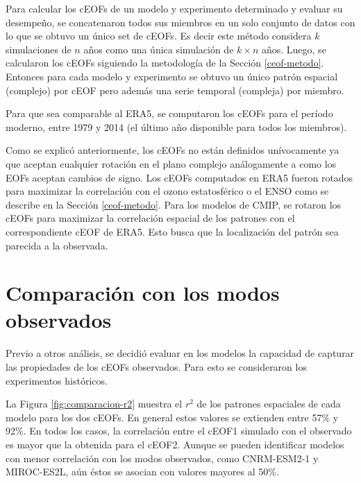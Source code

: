 \documentclass[12pt,oneside,a4paper]{reedthesis}
\begin{document}
Para calcular los cEOFs de un modelo y experimento determinado y evaluar su desempeño, se concatenaron todos sus miembros en un solo conjunto de datos con lo que se obtuvo un único set de cEOFs.
Es decir este método considera \(k\) simulaciones de \(n\) años como una única simulación de \(k\times n\) años.
Luego, se calcularon los cEOFs siguiendo la metodología de la Sección \ref{ceof-metodo}.
Entonces para cada modelo y experimento se obtuvo un único patrón espacial (complejo) por cEOF pero además una serie temporal (compleja) por miembro.

Para que sea comparable al ERA5, se computaron los cEOFs para el período moderno, entre 1979 y 2014 (el último año disponible para todos los miembros).

Como se explicó anteriormente, los cEOFs no están definidos unívocamente ya que aceptan cualquier rotación en el plano complejo análogamente a como los EOFs aceptan cambios de signo.
Los cEOFs computados en ERA5 fueron rotados para maximizar la correlación con el ozono estatosférico o el ENSO como se describe en la Sección \ref{ceof-metodo}.
Para los modelos de CMIP, se rotaron los cEOFs para maximizar la correlación espacial de los patrones con el correspondiente cEOF de ERA5.
Esto busca que la localización del patrón sea parecida a la observada.

\hypertarget{comparaciuxf3n-con-los-modos-observados}{%
\section{Comparación con los modos observados}\label{comparaciuxf3n-con-los-modos-observados}}

Previo a otros análisis, se decidió evaluar en los modelos la capacidad de capturar las propiedades de los cEOFs observados.
Para esto se consideraron los experimentos históricos.

La Figura \ref{fig:comparacion-r2} muestra el \(r^2\) de los patrones espaciales de cada modelo para los dos cEOFs.
En general estos valores se extienden entre 57\% y 92\%.
En todos los casos, la correlación entre el cEOF1 simulado con el observado es mayor que la obtenida para el cEOF2.
Aunque se pueden identificar modelos con menor correlación con los modos observados, como CNRM-ESM2-1 y MIROC-ES2L, aún éstos se asocian con valores mayores al 50\%.
\end{document}
